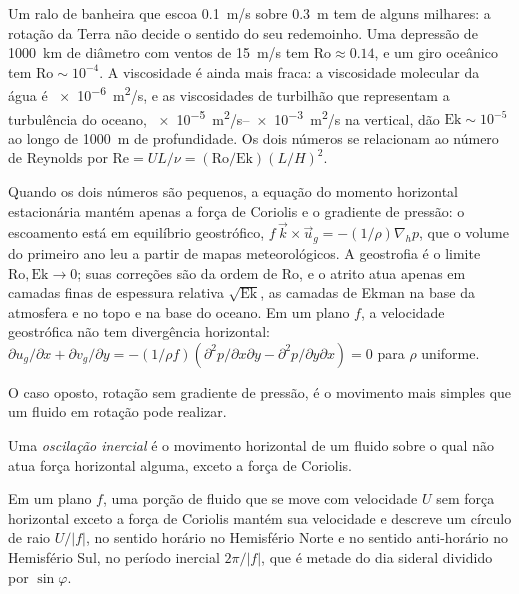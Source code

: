 Um ralo de banheira que escoa \qty{0.1}{m/s} sobre \qty{0.3}{m} tem  de
alguns milhares: a rotação da Terra não decide o sentido do seu redemoinho. Uma depressão de
\qty{1000}{km} de diâmetro com ventos de \qty{15}{m/s} tem
$\mathrm{Ro} \approx 0.14$, e um giro oceânico tem $\mathrm{Ro} \sim 10^{-4}$.
A viscosidade é ainda mais fraca: a viscosidade molecular da água é
\qty{e-6}{m^2/s}, e as viscosidades de turbilhão que representam a turbulência
do oceano, \qtyrange{e-5}{e-3}{m^2/s} na vertical, dão
$\mathrm{Ek} \sim 10^{-5}$ ao longo de \qty{1000}{m} de profundidade. Os dois números se
relacionam ao número de Reynolds por $\mathrm{Re} = UL/\nu =
(\mathrm{Ro}/\mathrm{Ek})(L/H)^2$.

Quando os dois números são pequenos, a equação do momento horizontal estacionária mantém
apenas a força de Coriolis e o gradiente de pressão: o escoamento está em
equilíbrio geostrófico, $f\,\vec k\times\vec u_g = -(1/\rho)\nabla_h p$, que o
volume do primeiro ano leu a partir de mapas meteorológicos. A geostrofia é o limite
$\mathrm{Ro}, \mathrm{Ek}\to 0$; suas correções são da ordem de
$\mathrm{Ro}$, e o atrito atua apenas em camadas finas de espessura relativa
$\sqrt{\mathrm{Ek}}$, as camadas de Ekman na base da atmosfera e no topo e na base do
oceano. Em um plano $f$, a velocidade geostrófica não tem divergência horizontal:
$\partial u_g/\partial x + \partial
v_g/\partial y = -(1/\rho f)(\partial^2 p/\partial x\partial y -
\partial^2 p/\partial y\partial x) = 0$ para $\rho$ uniforme.

O caso oposto, rotação sem gradiente de pressão, é o movimento mais simples
que um fluido em rotação pode realizar.

\begin{definition}\label{def:b3:gfd-foundations:inertial}
Uma \emph{oscilação inercial} é o
movimento horizontal de um fluido sobre o qual não atua força horizontal alguma, exceto a
força de Coriolis.
\end{definition}

\begin{theorem}\label{thm:b3:gfd-foundations:inertial}
Em um plano $f$, uma porção de fluido que se move com velocidade $U$ sem força horizontal
exceto a força de Coriolis mantém sua velocidade e descreve um círculo de raio
$U/|f|$, no sentido horário no Hemisfério Norte e no sentido anti-horário no
Hemisfério Sul, no período inercial $2\pi/|f|$, que é metade do dia sideral
dividido por $\sin\varphi$.
\end{theorem}

